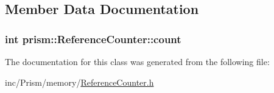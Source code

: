 \subsection{Member Data Documentation}
\subsubsection[{\texorpdfstring{count}{count}}]{\setlength{\rightskip}{0pt plus 5cm}int prism\+::\+Reference\+Counter\+::count}\hypertarget{classprism_1_1_reference_counter_a18e28845491bc0d8632a4075c8f341a9}{}\label{classprism_1_1_reference_counter_a18e28845491bc0d8632a4075c8f341a9}


The documentation for this class was generated from the following file\+:\begin{DoxyCompactItemize}
\item 
inc/\+Prism/memory/\hyperlink{_reference_counter_8h}{Reference\+Counter.\+h}\end{DoxyCompactItemize}
